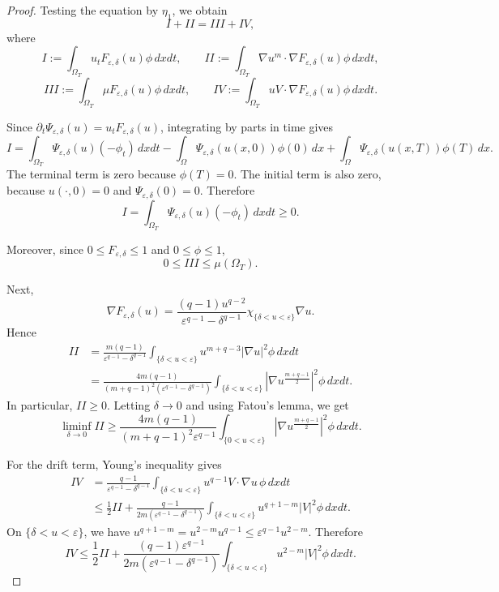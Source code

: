 \documentclass[10pt,a4paper]{amsart}
\begin{document}
\begin{proof}
Testing the equation by $\eta_1$, we obtain
\[
I+II=III+IV,
\]
where
\[
I:=
\int_{\Omega_T}
u_tF_{\varepsilon,\delta}(u)\phi\,dxdt,
\qquad
II:=
\int_{\Omega_T}
\nabla u^m\cdot\nabla F_{\varepsilon,\delta}(u)\phi\,dxdt,
\]
\[
III:=
\int_{\Omega_T}
\mu F_{\varepsilon,\delta}(u)\phi\,dxdt,
\qquad
IV:=
\int_{\Omega_T}
uV\cdot\nabla F_{\varepsilon,\delta}(u)\phi\,dxdt.
\]

Since $\partial_t\Psi_{\varepsilon,\delta}(u) = u_tF_{\varepsilon,\delta}(u)$, 
integrating by parts in time gives
\[
I
=
\int_{\Omega_T}
\Psi_{\varepsilon,\delta}(u)(-\phi_t)\,dxdt 
-\int_\Omega
\Psi_{\varepsilon,\delta}(u(x,0))\phi(0)\,dx
+
\int_\Omega
\Psi_{\varepsilon,\delta}(u(x,T))\phi(T)\,dx.
\]
The terminal term is zero because $\phi(T)=0$. The initial term is also zero,
because $u(\cdot,0)=0$ and 
$\Psi_{\varepsilon,\delta}(0)=0$.
Therefore
\begin{equation}\label{I01-smooth-u}
I
=
\int_{\Omega_T}
\Psi_{\varepsilon,\delta}(u)(-\phi_t)\,dxdt
\ge0.
\end{equation}

Moreover, since $0\le F_{\varepsilon,\delta}\le1$ and $0\le\phi\le1$,
\begin{equation}\label{III01-smooth-u}
0\le III\le \mu(\Omega_T).
\end{equation}

Next,
\[
\nabla F_{\varepsilon,\delta}(u)
=
\frac{(q-1)u^{q-2}}
{\varepsilon^{q-1}-\delta^{q-1}}
\chi_{\{\delta<u<\varepsilon\}}
\nabla u.
\]
Hence
\[
\begin{aligned}
II
&=
\frac{m(q-1)}
{\varepsilon^{q-1}-\delta^{q-1}}
\int_{\{\delta<u<\varepsilon\}}
u^{m+q-3}
|\nabla u|^2\phi\,dxdt  \\
&=
\frac{4m(q-1)}
{(m+q-1)^2(\varepsilon^{q-1}-\delta^{q-1})}
\int_{\{\delta<u<\varepsilon\}}
\left|\nabla u^{\frac{m+q-1}{2}}\right|^2\phi\,dxdt.
\end{aligned}
\]
In particular, $II\ge0$. Letting $\delta\to0$ and using Fatou's lemma, we get
\begin{equation}\label{II01-smooth-u}
\liminf_{\delta\to0}II
\ge
\frac{4m(q-1)}
{(m+q-1)^2\varepsilon^{q-1}}
\int_{\{0<u<\varepsilon\}}
\left|\nabla u^{\frac{m+q-1}{2}}\right|^2\phi\,dxdt.
\end{equation}

For the drift term, Young's inequality gives
\[
\begin{aligned}
IV
&=
\frac{q-1}{\varepsilon^{q-1}-\delta^{q-1}}
\int_{\{\delta<u<\varepsilon\}}
u^{q-1}V\cdot\nabla u\,\phi\,dxdt  \\
&\le
\frac12 II
+
\frac{q-1}{2m(\varepsilon^{q-1}-\delta^{q-1})}
\int_{\{\delta<u<\varepsilon\}}
u^{q+1-m}|V|^2\phi\,dxdt.
\end{aligned}
\]
On $\{\delta<u<\varepsilon\}$, we have
$
u^{q+1-m}
=
u^{2-m}u^{q-1}
\le
\varepsilon^{q-1}u^{2-m}$.
Therefore
\begin{equation}\label{IV01-smooth-u}
IV
\le
\frac12 II
+
\frac{(q-1)\varepsilon^{q-1}}
{2m(\varepsilon^{q-1}-\delta^{q-1})}
\int_{\{\delta<u<\varepsilon\}}
u^{2-m}|V|^2\phi\,dxdt.
\end{equation}


\end{proof}
\end{document}
